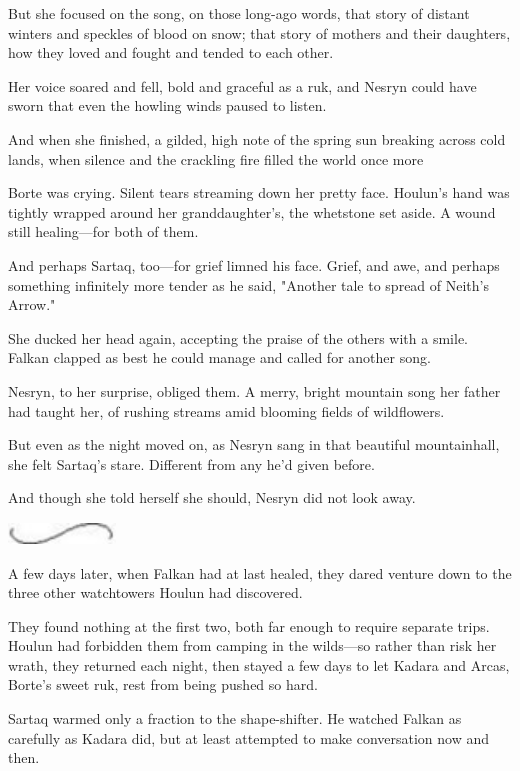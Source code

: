 But she focused on the song, on those long-ago words, that story of distant winters and speckles of blood on snow; that story of mothers and their daughters, how they loved and fought and tended to each other.

Her voice soared and fell, bold and graceful as a ruk, and Nesryn could have sworn that even the howling winds paused to listen.

And when she finished, a gilded, high note of the spring sun breaking across cold lands, when silence and the crackling fire filled the world once more 

Borte was crying.
Silent tears streaming down her pretty face.
Houlun's hand was tightly wrapped around her granddaughter's, the whetstone set aside.
A wound still healing---for both of them.

And perhaps Sartaq, too---for grief limned his face.
Grief, and awe, and perhaps something infinitely more tender as he said, "Another tale to spread of Neith's Arrow."

She ducked her head again, accepting the praise of the others with a smile.
Falkan clapped as best he could manage and called for another song.

Nesryn, to her surprise, obliged them.
A merry, bright mountain song her father had taught her, of rushing streams amid blooming fields of wildflowers.

But even as the night moved on, as Nesryn sang in that beautiful mountainhall, she felt Sartaq's stare.
Different from any he'd given before.

And though she told herself she should, Nesryn did not look away.

\begin{center}
	\includegraphics[width=1.12in,height=0.24in]{images/seperator}
\end{center}

A few days later, when Falkan had at last healed, they dared venture down to the three other watchtowers Houlun had discovered.

They found nothing at the first two, both far enough to require separate trips.
Houlun had forbidden them from camping in the wilds---so rather than risk her wrath, they returned each night, then stayed a few days to let Kadara and Arcas, Borte's sweet ruk, rest from being pushed so hard.

Sartaq warmed only a fraction to the shape-shifter.
He watched Falkan as carefully as Kadara did, but at least attempted to make conversation now and then.

